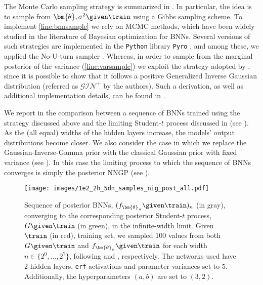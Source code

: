 The Monte Carlo sampling strategy is summarized in . In particular, the idea is to sample from $\bm{\theta}, \sigma^2 \given \train$ using a Gibbs sampling scheme. 
To implement \cref{line:bnnsample} we rely on MCMC methods, which have been widely studied in the literature of Bayesian optimization for BNNs. 
Several versions of such strategies are implemented in the \texttt{Python} library \texttt{Pyro} \citep{pyro,pytorch}, and among these, we applied the No-U-turn sampler \citep{hoffman2011}. 
Whereas, in order to sample from the marginal posterior of the variance (\cref{line:varsample}) we exploit the strategy adopted by \citet[Appendix D]{ding2022}, since it is possible to show that it follows a positive Generalized Inverse Gaussian distribution (referred as $\mathcal{GIN}^+$ by the authors). 
Such a derivation, as well as additional implementation details, can be found in .

We report in  the comparison between a sequence of BNNs trained using the strategy discussed above and the limiting Student-$t$ process discussed in  (see ). 
As the (all equal) widths of the hidden layers increase, the models' output distributions become closer. 
We also consider the case in which we replace the Gaussian-Inverse-Gamma prior with the classical Gaussian prior with fixed variance (see ). 
In this case the limiting process to which the sequence of BNNs converges is simply the posterior NNGP (see \citet{hron2020,trevisan2023}).

\begin{figure}
    \centering
    \texttt{[image: images/1e2\_2h\_5dn\_samples\_nig\_post\_all.pdf]}
    \captionsetup{width = .95\textwidth, font = small, skip = 2pt}
    \caption{%
        Sequence of posterior BNNs, \textcolor{plotgray}{$(f_{\bm{\theta}_n} \given \train)_n$} (in gray), converging to the corresponding posterior Student-$t$ process, \textcolor{plotgreen}{$G \given \train$} (in green), in the infinite-width limit. 
        Given \textcolor{plotred}{$\train$} (in red), training set, we sampled $100$ values from both $G \given \train$ and $f_{\bm{\theta}_n} \given \train$ for each width $n \in \{2^0, \dots, 2^7\}$, following  and , respectively. 
        The networks used have $2$ hidden layers, \texttt{erf} activations and parameter variances set to $5$. 
        Additionally, the hyperparameters $(a, b)$ are set to $(3, 2)$. 
    }
    \label{fig:normalinvgammaprior}
\end{figure}

